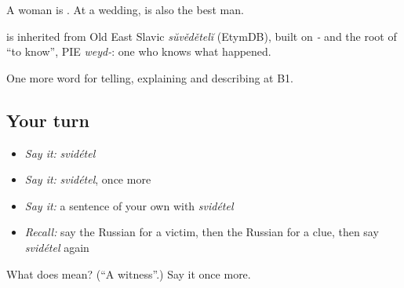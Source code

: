 A woman is \emph{}. At a wedding, \emph{} is also the best man.

\begin{cousinweb}
\emph{} is inherited from Old East Slavic \emph{sŭvědětelĭ} (EtymDB), built on \emph{-} and the root of \emph{} \textquotedblleft{}to know\textquotedblright{}, PIE \emph{weyd-}: one who knows what happened.
\end{cousinweb}

\begin{grammarlens}[title={What you've built}]
One more word for telling, explaining and describing at B1.
\end{grammarlens}

\subsection*{Your turn}
\begin{itemize}
\raggedright
  \item \emph{Say it:} \emph{svidétel}
  \item \emph{Say it:} \emph{svidétel}, once more
  \item \emph{Say it:} a sentence of your own with \emph{svidétel}
  \item \emph{Recall:} say the Russian for a victim, then the Russian for a clue, then say \emph{svidétel} again
\end{itemize}

\begin{tcolorbox}[breakable,colback=teal!4,colframe=teal!35!black,title={Before you move on}]
What does  mean? (\textquotedblleft{}A witness\textquotedblright{}.) Say it once more.
\end{tcolorbox}
